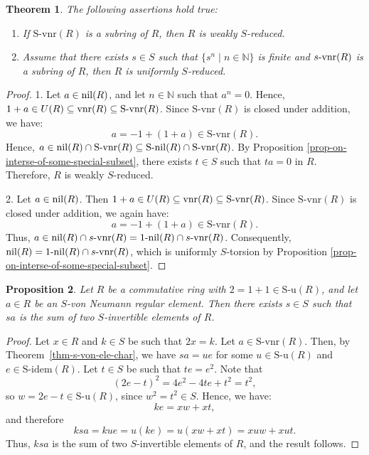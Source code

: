 \documentclass[12pt]{article}
\newtheorem{thm}{\bf Theorem}[section]
\newtheorem{prop}[thm]{\bf Proposition}
\newcommand{\field}[1]{\mathbb{#1}}
\newcommand{\N }{\field{N}}
\def\Sidem{\mathrm{S\text{-}idem}}
\def\Snil{\mathrm{S\text{-}nil}}
\def\Su{\mathrm{S\text{-}u}}
\def\Svnr{\mathrm{S\text{-}vnr}}
\def\nil{{\rm nil}}
\def\vnr{{\rm vnr}}
\begin{document}
\begin{thm} The following assertions hold true: 
\begin{enumerate}
\item If \( \Svnr(R) \) is a subring of \( R \), then \( R \) is weakly \( S \)-reduced.

\item Assume that there exists \( s \in S \) such that \( \{s^n \mid n \in \mathbb{N} \} \) is finite and \( s\text{-}\vnr(R) \) is a subring of \( R \), then \( R \) is uniformly \( S \)-reduced.
\end{enumerate}
\end{thm}
\begin{proof}
1. Let \( a \in \nil(R) \), and let $n \in \N$ such that $a^n=0$. Hence, \( 1 + a \in U(R) \subseteq \vnr(R) \subseteq \Svnr(R) \). Since \( \Svnr(R) \) is closed under addition, we have:
\[
a = -1 + (1 + a) \in \Svnr(R).
\]
Hence, \( a \in \nil(R) \cap \Svnr(R) \subseteq \Snil(R) \cap \Svnr(R) \). By Proposition \ref{prop-on-interse-of-some-special-subset}, there exists \( t \in S \) such that \( ta = 0 \) in \( R \). Therefore, \( R \) is weakly \( S \)-reduced.

2. Let \( a \in \nil(R) \). Then \( 1 + a \in U(R) \subseteq \vnr(R) \subseteq \Svnr(R) \). Since \( \Svnr(R) \) is closed under addition, we again have:
\[
a = -1 + (1 + a) \in \Svnr(R).
\]
Thus, \( a \in \nil(R) \cap s\text{-}\vnr(R) = 1\text{-}\nil(R) \cap s\text{-}\vnr(R) \). Consequently, \( \nil(R) = 1\text{-}\nil(R) \cap s\text{-}\vnr(R) \), which is uniformly \( S \)-torsion by Proposition \ref{prop-on-interse-of-some-special-subset}. 
\end{proof}



\begin{prop}\label{prop-if-2-u-s-inv-then-S-von-is-sum-of-2-S-inve}
Let \( R \) be a commutative ring with \( 2 = 1 + 1 \in \Su(R) \), and let \( a \in R \) be an \( S \)-von Neumann regular element. Then there exists \( s \in S \) such that \( sa \) is the sum of two \( S \)-invertible elements of \( R \).
\end{prop}

\begin{proof}
Let \( x \in R \) and \( k \in S \) be such that \( 2x = k \). Let \( a \in \Svnr(R) \). Then, by Theorem~\ref{thm-s-von-ele-char}, we have \( sa = ue \) for some \( u \in \Su(R) \) and \( e \in \Sidem(R) \). Let  \( t \in S \) be such that  \( te = e^2 \). Note that
\[
(2e - t)^2 = 4e^2 - 4te + t^2 = t^2,
\]
so \( w = 2e - t \in \Su(R) \), since \( w^2 = t^2 \in S \). Hence, we have:
\[
ke = xw + xt,
\]
and therefore
\[
ksa = kue = u(ke) = u(xw + xt) = xuw + xut.
\]
 Thus, \( ksa \) is the sum of two \( S \)-invertible elements of \( R \), and the result follows.
\end{proof}
\end{document}

